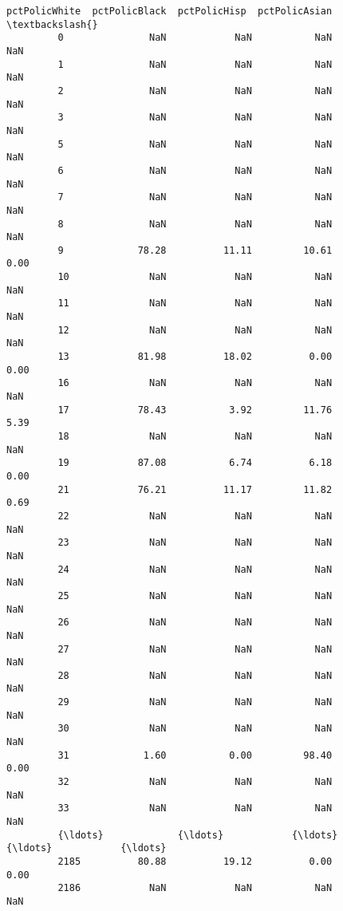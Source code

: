 \documentclass[11pt]{llncs}
\begin{document}
\begin{Verbatim}[commandchars=\\\{\}]
               pctPolicWhite  pctPolicBlack  pctPolicHisp  pctPolicAsian  \textbackslash{}
         0               NaN            NaN           NaN            NaN   
         1               NaN            NaN           NaN            NaN   
         2               NaN            NaN           NaN            NaN   
         3               NaN            NaN           NaN            NaN   
         5               NaN            NaN           NaN            NaN   
         6               NaN            NaN           NaN            NaN   
         7               NaN            NaN           NaN            NaN   
         8               NaN            NaN           NaN            NaN   
         9             78.28          11.11         10.61           0.00   
         10              NaN            NaN           NaN            NaN   
         11              NaN            NaN           NaN            NaN   
         12              NaN            NaN           NaN            NaN   
         13            81.98          18.02          0.00           0.00   
         16              NaN            NaN           NaN            NaN   
         17            78.43           3.92         11.76           5.39   
         18              NaN            NaN           NaN            NaN   
         19            87.08           6.74          6.18           0.00   
         21            76.21          11.17         11.82           0.69   
         22              NaN            NaN           NaN            NaN   
         23              NaN            NaN           NaN            NaN   
         24              NaN            NaN           NaN            NaN   
         25              NaN            NaN           NaN            NaN   
         26              NaN            NaN           NaN            NaN   
         27              NaN            NaN           NaN            NaN   
         28              NaN            NaN           NaN            NaN   
         29              NaN            NaN           NaN            NaN   
         30              NaN            NaN           NaN            NaN   
         31             1.60           0.00         98.40           0.00   
         32              NaN            NaN           NaN            NaN   
         33              NaN            NaN           NaN            NaN   
         {\ldots}             {\ldots}            {\ldots}           {\ldots}            {\ldots}   
         2185          80.88          19.12          0.00           0.00   
         2186            NaN            NaN           NaN            NaN   

\end{Verbatim}
\end{document}

